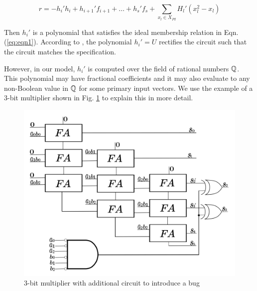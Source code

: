 \vspace{-0.15in}

\begin{equation}
    r = -h_i'h_i+h_{i+1}'f_{i+1}+\dots+h_s'f_s+ \sum_{x_l \in X_{PI}} H_l' (x_l^2-x_l)
    \label{eq:eqn6}
\end{equation}

Then $h_i'$ is a polynomial that satisfies the ideal membership
relation in Eqn. (\ref{eq:eqn1}). According to \cite{utkarsh:fmcad18},
the polynomial $h_i' = U$  rectifies the circuit such that the circuit
matches the specification.   

However, in our model, $h_i'$ is computed over the field of
rational numbers ${\mathbb{Q}}$. This polynomial may have fractional
coefficients and it may also evaluate to any non-Boolean value in ${\mathbb{Q}}$
for some primary input vectors. We use the example of a 3-bit
multiplier shown in Fig. \ref{fig:3appmult} to explain this in more
detail.  

\begin{figure}[H]
    \centering
    \includegraphics[scale = 0.06]{3appmult.png}
    \caption{3-bit multiplier with additional circuit to introduce a bug}
    \label{fig:3appmult}
\end{figure}

